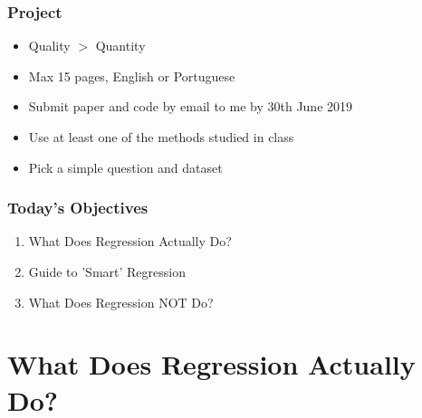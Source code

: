 \documentclass[xcolor=x11names,compress]{beamer}\usepackage[]{graphicx}\usepackage[]{color}
\renewcommand{\(}{\begin{columns}}
\renewcommand{\)}{\end{columns}}
\newcommand{\<}[1]{\begin{column}{#1}}
\renewcommand{\>}{\end{column}}
\begin{document}
\begin{frame}
\frametitle{Project}
\begin{itemize}
\item Quality $>$ Quantity
\item Max 15 pages, English or Portuguese
\item Submit paper and code by email to me by 30th June 2019
\item Use at least one of the methods studied in class
\item Pick a simple question and dataset
\end{itemize}
\end{frame}

\begin{frame}
\frametitle{Today's Objectives}
\begin{enumerate}
\item What Does Regression Actually Do?
\item Guide to 'Smart' Regression
\item What Does Regression NOT Do?
\end{enumerate}
\end{frame}

\section{What Does Regression Actually Do?}
\end{document}
